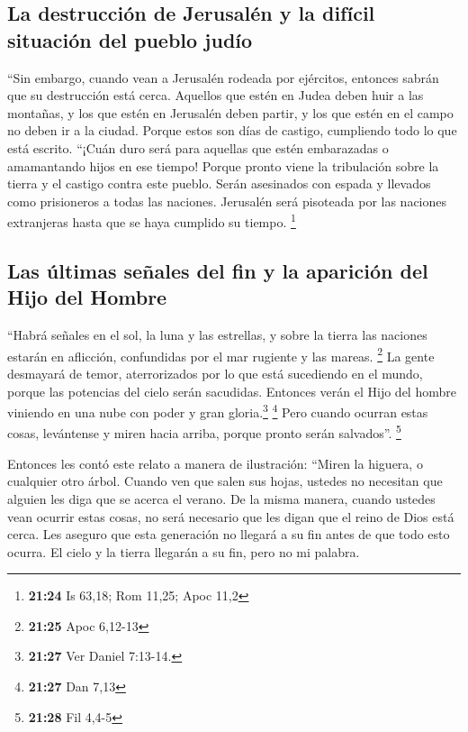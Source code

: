 \hypertarget{la-destrucciuxf3n-de-jerusaluxe9n-y-la-difuxedcil-situaciuxf3n-del-pueblo-juduxedo}{%
\subsection{La destrucción de Jerusalén y la difícil situación del
pueblo
judío}\label{la-destrucciuxf3n-de-jerusaluxe9n-y-la-difuxedcil-situaciuxf3n-del-pueblo-juduxedo}}

 ``Sin embargo, cuando vean a Jerusalén rodeada por
ejércitos, entonces sabrán que su destrucción está cerca.
 Aquellos que estén en Judea deben huir a las montañas, y
los que estén en Jerusalén deben partir, y los que estén en el campo no
deben ir a la ciudad.  Porque estos son días de castigo,
cumpliendo todo lo que está escrito.  ``¡Cuán duro será
para aquellas que estén embarazadas o amamantando hijos en ese tiempo!
Porque pronto viene la tribulación sobre la tierra y el castigo contra
este pueblo.  Serán asesinados con espada y llevados como
prisioneros a todas las naciones. Jerusalén será pisoteada por las
naciones extranjeras hasta que se haya cumplido su tiempo. \footnote{\textbf{21:24}
  Is 63,18; Rom 11,25; Apoc 11,2}

\hypertarget{las-uxfaltimas-seuxf1ales-del-fin-y-la-apariciuxf3n-del-hijo-del-hombre}{%
\subsection{Las últimas señales del fin y la aparición del Hijo del
Hombre}\label{las-uxfaltimas-seuxf1ales-del-fin-y-la-apariciuxf3n-del-hijo-del-hombre}}

 ``Habrá señales en el sol, la luna y las estrellas, y
sobre la tierra las naciones estarán en aflicción, confundidas por el
mar rugiente y las mareas. \footnote{\textbf{21:25} Apoc 6,12-13}
 La gente desmayará de temor, aterrorizados por lo que
está sucediendo en el mundo, porque las potencias del cielo serán
sacudidas.  Entonces verán el Hijo del hombre viniendo en
una nube con poder y gran gloria.\footnote{\textbf{21:27} Ver Daniel
  7:13-14.} \footnote{\textbf{21:27} Dan 7,13}  Pero
cuando ocurran estas cosas, levántense y miren hacia arriba, porque
pronto serán salvados''. \footnote{\textbf{21:28} Fil 4,4-5}

 Entonces les contó este relato a manera de ilustración:
``Miren la higuera, o cualquier otro árbol.  Cuando ven
que salen sus hojas, ustedes no necesitan que alguien les diga que se
acerca el verano.  De la misma manera, cuando ustedes
vean ocurrir estas cosas, no será necesario que les digan que el reino
de Dios está cerca.  Les aseguro que esta generación no
llegará a su fin antes de que todo esto ocurra.  El cielo
y la tierra llegarán a su fin, pero no mi palabra.

